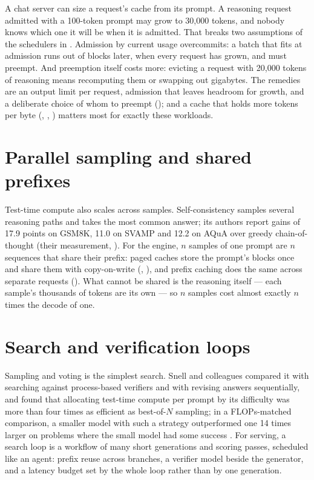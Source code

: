 A chat server can size a request's cache from its prompt. A reasoning request
admitted with a 100-token prompt may grow to 30,000 tokens, and nobody knows
which one it will be when it is admitted. That breaks two assumptions of the
schedulers in . Admission by current usage overcommits: a
batch that fits at admission runs out of blocks later, when every request has
grown, and must preempt. And preemption itself costs more: evicting a request
with 20,000 tokens of reasoning means recomputing them or swapping out
gigabytes. The remedies are an output limit per request, admission that
leaves headroom for growth, and a deliberate choice of whom to preempt
(); and a cache that holds more tokens per byte
(, , ) matters
most for exactly these workloads.

\section{Parallel sampling and shared prefixes}

Test-time compute also scales across samples. Self-consistency samples several
reasoning paths and takes the most common answer; its authors report gains of
17.9 points on GSM8K, 11.0 on SVAMP and 12.2 on AQuA over greedy
chain-of-thought (their measurement, \cite{wang2023selfconsistency}). For the
engine, $n$ samples of one prompt are $n$ sequences that share their prefix:
paged caches store the prompt's blocks once and share them with copy-on-write
(, \cite{kwon2023pagedattention}), and prefix caching does the
same across separate requests (). What cannot be shared
is the reasoning itself --- each sample's thousands of tokens are its own --- so
$n$ samples cost almost exactly $n$ times the decode of one.

\section{Search and verification loops}

Sampling and voting is the simplest search. Snell and colleagues compared it
with searching against process-based verifiers and with revising answers
sequentially, and found that allocating test-time compute per prompt by its
difficulty was more than four times as efficient as best-of-$N$ sampling; in a
FLOPs-matched comparison, a smaller model with such a strategy outperformed one
14 times larger on problems where the small model had some success
\cite{snell2024testtime}. For serving, a search loop is a workflow of many
short generations and scoring passes, scheduled like an agent: prefix reuse
across branches, a verifier model beside the generator, and a latency budget
set by the whole loop rather than by one generation.

